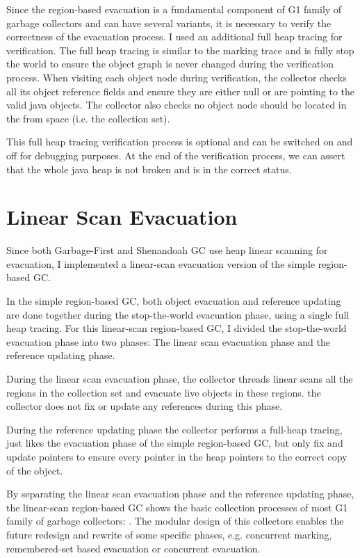 Since the region-based evacuation is a fundamental component of G1 family of garbage collectors
and can have several variants, it is necessary to verify the correctness of the evacuation process.
I used an additional full heap tracing for verification. The full heap tracing is
similar to the marking trace and is fully stop the world to ensure the object graph is never changed
during the verification process.
When visiting each object node during verification, the collector checks all its object reference fields
and ensure they are either null or are pointing to the valid java objects.
The collector also checks no object node should be located in the from space (i.e. the collection set).

This full heap tracing verification process is optional and can be switched on and off for
debugging purposes.
At the end of the verification process, we can assert that the whole java heap is
not broken and is in the correct status.

\section{Linear Scan Evacuation}
\label{sec:linearscangc}

Since both Garbage-First and Shenandoah GC use heap linear scanning for evacuation,
I implemented a linear-scan evacuation version of the simple region-based GC.

In the simple region-based GC, both object evacuation and reference updating are
done together during the stop-the-world evacuation phase, using a single full heap tracing.
For this linear-scan region-based GC, I divided the stop-the-world evacuation phase into
two phases: The linear scan evacuation phase and the reference updating phase.

During the linear scan evacuation phase, the collector threads linear scans all the regions
in the collection set and evacuate live objects in these regions. the collector does not
fix or update any references during this phase.

During the reference updating phase the collector performs a full-heap tracing,
just likes the evacuation phase of the simple region-based GC, but only fix and update
pointers to ensure every pointer in the heap pointers to the correct copy of the object.

By separating the linear scan evacuation phase and the reference updating phase,
the linear-scan region-based GC shows the basic collection processes of most G1 family
of garbage collectors: .
The modular design of this collectors enables the future redesign and rewrite of some specific
phases, e.g. concurrent marking, remembered-set based evacuation or concurrent evacuation.

